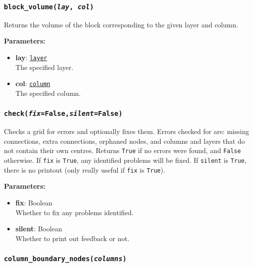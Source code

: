 \begin{snugshade}\subsubsection{\texttt{block\_volume(\emph{lay}, \emph{col})}}\end{snugshade}
\label{sec:mulgrid:block_volume}

Returns the volume of the block corresponding to the given layer and column.

\textbf{Parameters:}
\begin{itemize}
\item \textbf{lay}: \hyperref[layerobjects]{\texttt{layer}}\\
  The specified layer.
\item \textbf{col}: \hyperref[columnobjects]{\texttt{column}}\\
  The specified column.
\end{itemize}

\begin{snugshade}\subsubsection{\texttt{check(\emph{fix}=False,\emph{silent}=False)}}\end{snugshade}
\label{sec:mulgrid:check}

Checks a grid for errors and optionally fixes them.  Errors checked for are: missing connections, extra connections, orphaned nodes, and columns and layers that do not contain their own centres.  Returns \texttt{True} if no errors were found, and \texttt{False} otherwise.  If \texttt{fix} is \texttt{True}, any identified problems will be fixed.  If \texttt{silent} is \texttt{True}, there is no printout (only really useful if \texttt{fix} is \texttt{True}).

\textbf{Parameters:}
\begin{itemize}
\item \textbf{fix}: Boolean\\
  Whether to fix any problems identified.
\item \textbf{silent}: Boolean\\
  Whether to print out feedback or not.
\end{itemize}

\begin{snugshade}\subsubsection{\texttt{column\_boundary\_nodes(\emph{columns})}}\end{snugshade}
\label{sec:mulgrid:column_boundary_nodes}

